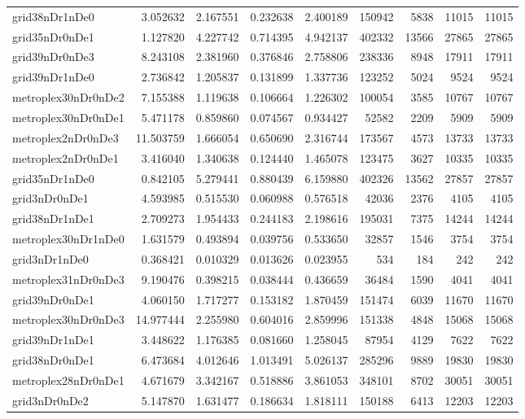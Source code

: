 \begin{longtable}{|l|r|r|r|r|r|r|r|r|}
grid38nDr1nDe0 & 3.052632 & 2.167551 & 0.232638 & 2.400189 & 150942 & 5838 & 11015 & 11015 \\
grid35nDr0nDe1 & 1.127820 & 4.227742 & 0.714395 & 4.942137 & 402332 & 13566 & 27865 & 27865 \\
grid39nDr0nDe3 & 8.243108 & 2.381960 & 0.376846 & 2.758806 & 238336 & 8948 & 17911 & 17911 \\
grid39nDr1nDe0 & 2.736842 & 1.205837 & 0.131899 & 1.337736 & 123252 & 5024 & 9524 & 9524 \\
metroplex30nDr0nDe2 & 7.155388 & 1.119638 & 0.106664 & 1.226302 & 100054 & 3585 & 10767 & 10767 \\
metroplex30nDr0nDe1 & 5.471178 & 0.859860 & 0.074567 & 0.934427 & 52582 & 2209 & 5909 & 5909 \\
metroplex2nDr0nDe3 & 11.503759 & 1.666054 & 0.650690 & 2.316744 & 173567 & 4573 & 13733 & 13733 \\
metroplex2nDr0nDe1 & 3.416040 & 1.340638 & 0.124440 & 1.465078 & 123475 & 3627 & 10335 & 10335 \\
grid35nDr1nDe0 & 0.842105 & 5.279441 & 0.880439 & 6.159880 & 402326 & 13562 & 27857 & 27857 \\
grid3nDr0nDe1 & 4.593985 & 0.515530 & 0.060988 & 0.576518 & 42036 & 2376 & 4105 & 4105 \\
grid38nDr1nDe1 & 2.709273 & 1.954433 & 0.244183 & 2.198616 & 195031 & 7375 & 14244 & 14244 \\
metroplex30nDr1nDe0 & 1.631579 & 0.493894 & 0.039756 & 0.533650 & 32857 & 1546 & 3754 & 3754 \\
grid3nDr1nDe0 & 0.368421 & 0.010329 & 0.013626 & 0.023955 & 534 & 184 & 242 & 242 \\
metroplex31nDr0nDe3 & 9.190476 & 0.398215 & 0.038444 & 0.436659 & 36484 & 1590 & 4041 & 4041 \\
grid39nDr0nDe1 & 4.060150 & 1.717277 & 0.153182 & 1.870459 & 151474 & 6039 & 11670 & 11670 \\
metroplex30nDr0nDe3 & 14.977444 & 2.255980 & 0.604016 & 2.859996 & 151338 & 4848 & 15068 & 15068 \\
grid39nDr1nDe1 & 3.448622 & 1.176385 & 0.081660 & 1.258045 & 87954 & 4129 & 7622 & 7622 \\
grid38nDr0nDe1 & 6.473684 & 4.012646 & 1.013491 & 5.026137 & 285296 & 9889 & 19830 & 19830 \\
metroplex28nDr0nDe1 & 4.671679 & 3.342167 & 0.518886 & 3.861053 & 348101 & 8702 & 30051 & 30051 \\
grid3nDr0nDe2 & 5.147870 & 1.631477 & 0.186634 & 1.818111 & 150188 & 6413 & 12203 & 12203 \\

\end{longtable}
